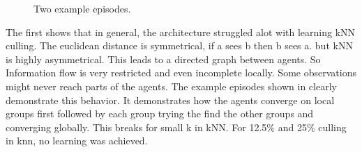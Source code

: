 \begin{figure}[htp]
    \centering
    \hspace{1cm}                       
    \caption{Two example episodes.}
    \label{fig:observation-examples}
\end{figure}

The first  shows that in general, the architecture struggled alot with learning kNN culling. The euclidean distance is symmetrical, if a sees b then b sees a. but kNN is highly asymmetrical. This leads to a directed graph between agents. So Information flow is very restricted and even incomplete locally. Some observations might never reach parts of the agents. The example episodes shown in  clearly demonstrate this behavior. It demonstrates how the agents converge on local groups first followed by each group trying the find the other groups and converging globally. This breaks for small k in kNN. For 12.5$\%$ and 25$\%$ culling in knn, no learning was achieved.



